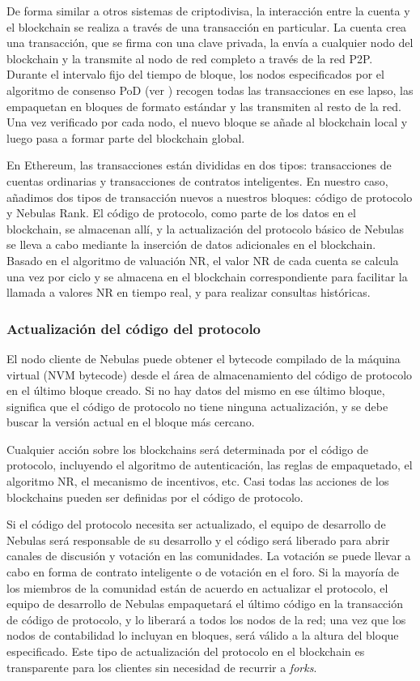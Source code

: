 De forma similar a otros sistemas de criptodivisa, la interacción entre la cuenta y el blockchain se realiza a través de una transacción en particular. La cuenta crea una transacción, que se firma con una clave privada, la envía a cualquier nodo del blockchain y la transmite al nodo de red completo a través de la red P2P. Durante el intervalo fijo del tiempo de bloque, los nodos especificados por el algoritmo de consenso PoD (ver ) recogen todas las transacciones en ese lapso, las empaquetan en bloques de formato estándar y las transmiten al resto de la red. Una vez verificado por cada nodo, el nuevo bloque se añade al blockchain local y luego pasa a formar parte del blockchain global.

En Ethereum, las transacciones están divididas en dos tipos: transacciones de cuentas ordinarias y transacciones de contratos inteligentes. En nuestro caso, añadimos dos tipos de transacción nuevos a nuestros bloques: código de protocolo y Nebulas Rank. El código de protocolo, como parte de los datos en el blockchain, se almacenan allí, y la actualización del protocolo básico de Nebulas se lleva a cabo mediante la inserción de datos adicionales en el blockchain. Basado en el algoritmo de valuación NR, el valor NR de cada cuenta se calcula una vez por ciclo y se almacena en el blockchain correspondiente para facilitar la llamada a valores NR en tiempo real, y para realizar consultas históricas.

\subsubsection{Actualización del código del protocolo}

El nodo cliente de Nebulas puede obtener el bytecode compilado de la máquina virtual (NVM bytecode) desde el área de almacenamiento del código de protocolo en el último bloque creado. Si no hay datos del mismo en ese último bloque, significa que el código de protocolo no tiene ninguna actualización, y se debe buscar la versión actual en el bloque más cercano.

Cualquier acción sobre los blockchains será determinada por el código de protocolo, incluyendo el algoritmo de autenticación, las reglas de empaquetado, el algoritmo NR, el mecanismo de incentivos, etc. Casi todas las acciones de los blockchains pueden ser definidas por el código de protocolo.

Si el código del protocolo necesita ser actualizado, el equipo de desarrollo de Nebulas será responsable de su desarrollo y el código será liberado para abrir canales de discusión y votación en las comunidades. La votación se puede llevar a cabo en forma de contrato inteligente o de votación en el foro. Si la mayoría de los miembros de la comunidad están de acuerdo en actualizar el protocolo, el equipo de desarrollo de Nebulas empaquetará el último código en la transacción de código de protocolo, y lo liberará a todos los nodos de la red; una vez que los nodos de contabilidad lo incluyan en bloques, será válido a la altura del bloque especificado. Este tipo de actualización del protocolo en el blockchain es transparente para los clientes sin necesidad de recurrir a \textit{forks}.

